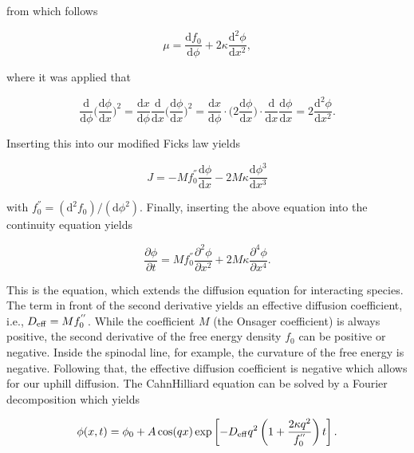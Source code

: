 \documentclass[letterpaper,10pt,english]{sphinxmanual}
\begin{document}
\sphinxAtStartPar
from which follows

\sphinxAtStartPar
\begin{equation}
\mu=\frac{\mathrm{d}f_{0}}{\mathrm d\phi}+2\kappa\frac{\mathrm d^2\phi}{\mathrm dx^2},
\end{equation}

\sphinxAtStartPar
where it was applied that

\sphinxAtStartPar
\begin{equation}
\frac{\mathrm{d}}{\mathrm{d}\phi}\bigg(\frac{\mathrm{d}\phi}{\mathrm{d}x}\bigg)^2=\frac{\mathrm{d}x}{\mathrm{d}\phi}\frac{\mathrm{d}}{\mathrm{d}x}\bigg(\frac{\mathrm{d}\phi}{\mathrm{d}x}\bigg)^2=\frac{\mathrm{d}x}{\mathrm{d}\phi}\cdot \bigg(2\frac{\mathrm{d}\phi}{\mathrm{d}x}\bigg)\cdot\frac{\mathrm{d}}{\mathrm{d}x}\frac{\mathrm{d}\phi}{\mathrm{d}x}=2\frac{\mathrm{d}^2\phi}{\mathrm{d}x^2}.
\end{equation}

\sphinxAtStartPar
Inserting this into our modified Ficks law yields

\sphinxAtStartPar
\begin{equation}
J=-M f_{0}^{''}\frac{\mathrm d\phi}{\mathrm dx}-2M\kappa \frac{\mathrm d\phi^{3}}{\mathrm dx^3}
\end{equation}

\sphinxAtStartPar
with \(f_0^″=(\mathrm{d}^2 f_0)/(\mathrm{d}ϕ^2)\). Finally, inserting the above equation into the continuity equation yields

\sphinxAtStartPar
\begin{equation}
\frac{\partial \phi}{\partial t}=M f_{0}^{''}\frac{\partial ^2\phi}{\partial x^2}+2M\kappa \frac{\partial^4 \phi}{\partial x^4}.
\end{equation}

\sphinxAtStartPar
This is the  equation, which extends the diffusion equation for interacting species. The term in front of the second derivative yields an effective diffusion coefficient, i.e., \(D_{\rm eff}=M f_{0}^{''}\). While the coefficient \(M\) (the Onsager coefficient) is always positive, the second derivative of the free energy density \(f_0\) can be positive or negative. Inside the spinodal line, for example, the curvature of the free energy is negative. Following that, the
effective diffusion coefficient is negative which allows for our uphill diffusion. The Cahn\textendash{}Hilliard equation can be solved by a Fourier decomposition which yields

\sphinxAtStartPar
\begin{equation}
\phi(x,t)=\phi_{0}+A\cos(qx)\exp\left [ -D_{\rm eff} q^{2}\left (1+\frac{2\kappa q^{2}}{f_{0}^{''}}\right ) t\right ].
\end{equation}
\end{document}
